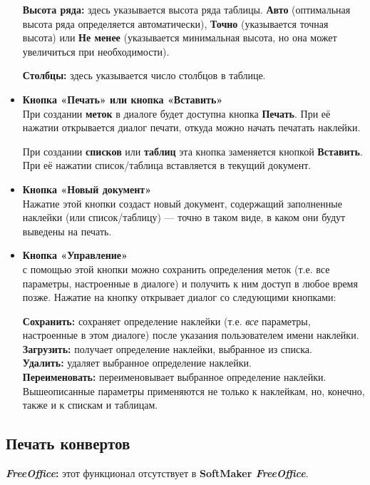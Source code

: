 ﻿\documentclass[a4paper,10pt]{article}
\begin{document}
\begin{itemize}
  \textbf{Высота ряда:} здесь указывается высота ряда таблицы. \textbf{Авто} (оптимальная высота ряда определяется автоматически), \textbf{Точно} (указывается точная высота) или \textbf{Не менее} (указывается минимальная высота, но она может увеличиться при необходимости).
  
  \textbf{Столбцы:} здесь указывается число столбцов в таблице.
  \item \textbf{Кнопка «Печать» или кнопка «Вставить»}\\
  При создании \textbf{меток} в диалоге будет доступна кнопка \textbf{Печать}. При её нажатии открывается диалог печати, откуда можно начать печатать наклейки.
  
  При создании \textbf{списков} или \textbf{таблиц} эта кнопка заменяется кнопкой \textbf{Вставить}. При её нажатии список/таблица вставляется в текущий документ.
  \item \textbf{Кнопка «Новый документ»}\\
  Нажатие этой кнопки создаст новый документ, содержащий заполненные наклейки (или список/таблицу) — точно в таком виде, в каком они будут выведены на печать.
  \item \textbf{Кнопка «Управление»}\\
  с помощью этой кнопки можно сохранить определения меток (т.е. все параметры, настроенные в диалоге) и получить к ним доступ в любое время позже. Нажатие на кнопку открывает диалог со следующими кнопками:
  
  \textbf{Сохранить:} сохраняет определение наклейки (т.е. \textit{все} параметры, настроенные в этом диалоге) после указания пользователем имени наклейки.\\
  \textbf{Загрузить:} получает определение наклейки, выбранное из списка.\\
  \textbf{Удалить:} удаляет выбранное определение наклейки.\\
  \textbf{Переименовать:} переименовывает выбранное определение наклейки.\\
  
  Вышеописанные параметры применяются не только к наклейкам, но, конечно, также и к спискам и таблицам.
 \end{itemize}

\subsection{Печать конвертов}
\begin{mdframed}[backgroundcolor=pink!50]
\textbf{\textit{FreeOffice}:} этот функционал отсутствует в \textbf{SoftMaker \textit{FreeOffice}}.
\end{mdframed}
\end{document}
